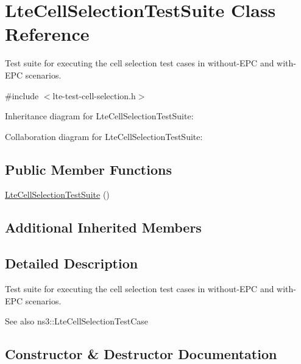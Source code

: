 \hypertarget{classLteCellSelectionTestSuite}{}\section{Lte\+Cell\+Selection\+Test\+Suite Class Reference}
\label{classLteCellSelectionTestSuite}


Test suite for executing the cell selection test cases in without-\/\+E\+PC and with-\/\+E\+PC scenarios.  




{\ttfamily \#include $<$lte-\/test-\/cell-\/selection.\+h$>$}



Inheritance diagram for Lte\+Cell\+Selection\+Test\+Suite\+:


Collaboration diagram for Lte\+Cell\+Selection\+Test\+Suite\+:
\subsection*{Public Member Functions}
\begin{DoxyCompactItemize}
\item 
\hyperlink{classLteCellSelectionTestSuite_a6b60958ceff4f841288857ccbdcb9824}{Lte\+Cell\+Selection\+Test\+Suite} ()
\end{DoxyCompactItemize}
\subsection*{Additional Inherited Members}


\subsection{Detailed Description}
Test suite for executing the cell selection test cases in without-\/\+E\+PC and with-\/\+E\+PC scenarios. 

\begin{DoxySeeAlso}{See also}
ns3\+::\+Lte\+Cell\+Selection\+Test\+Case 
\end{DoxySeeAlso}


\subsection{Constructor \& Destructor Documentation}

